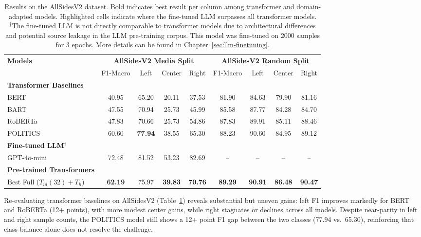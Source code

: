 \begin{table}[t!]
\centering
\small
\begin{tabular}{@{}lcccccccc@{}}
\toprule
\textbf{Models} & \multicolumn{4}{c}{\textbf{AllSidesV2 Media Split}} & \multicolumn{4}{c}{\textbf{AllSidesV2 Random Split}} \\
 & F1-Macro & Left & Center & Right & F1-Macro & Left & Center & Right \\
\midrule
\textbf{Transformer Baselines} & & & & & & & & \\
BERT & 40.95 & 65.20 & 20.11 & 37.53 & 81.90 & 84.63 & 79.90 & 81.16 \\
BART & 47.55 & 70.94 & 25.73 & 45.99 & 85.58 & 87.77 & 84.28 & 84.70 \\
RoBERTa & 47.83 & 70.66 & 25.73 & 54.86 & 87.83 & 89.91 & 85.11 & 88.46 \\
POLITICS & 60.60 & \textbf{77.94} & 38.55 & 65.30 & 88.23 & 90.60 & 84.95 & 89.12 \\
\midrule
\textbf{Fine-tuned LLM}$^\dagger$ & & & & & & & & \\
GPT-4o-mini & \cellcolor{blue!15}72.48 & \cellcolor{blue!15}81.52 & \cellcolor{blue!15}53.23 & \cellcolor{blue!15}82.69 & -- & -- & -- & -- \\
\midrule
\textbf{Pre-trained Transformers} & & & & & & & & \\
Best Full ($T_{id}(32){+}T_h$) & \textbf{62.19} & 75.97 & \textbf{39.83} & \textbf{70.76} & \textbf{89.29} & \textbf{90.91} & \textbf{86.48} & \textbf{90.47} \\
\bottomrule
\end{tabular}
\caption{Results on the AllSidesV2 dataset. Bold indicates best result per column among transformer and domain-adapted models. \colorbox{blue!15}{Highlighted} cells indicate where the fine-tuned LLM surpasses all transformer models.\\
$^\dagger$The fine-tuned LLM is not directly comparable to transformer models due to architectural differences and potential source leakage in the LLM pre-training corpus. This model was fine-tuned on 2000 samples for 3 epochs. More details can be found in Chapter~\ref{sec:llm-finetuning}.}
\label{tab:extended_main}
\end{table}

Re-evaluating transformer baselines on AllSidesV2 (Table~\ref{tab:extended_main}) reveals substantial but uneven gains: left F1 improves markedly for BERT and RoBERTa (12+ points), with more modest center gains, while right stagnates or declines across all models. Despite near-parity in left and right sample counts, the POLITICS model still shows a 12+ point F1 gap between the two classes (77.94 vs.\ 65.30), reinforcing that class balance alone does not resolve the challenge.

